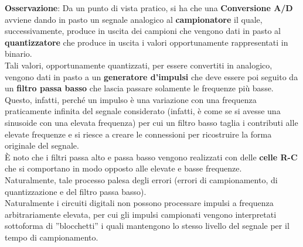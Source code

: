 \documentclass[a4paper]{extarticle}
\newcommand{\quotes}[1]{''#1''}
\begin{document}
\vspace{1em}
\noindent
\textbf{Osservazione}: Da un punto di vista pratico, si ha che una \textbf{Conversione A/D} avviene dando in pasto un segnale analogico al \textbf{campionatore} il quale, successivamente, produce in uscita dei campioni che vengono dati in pasto al \textbf{quantizzatore} che produce in uscita i valori opportunamente rappresentati in binario.\\
Tali valori, opportunamente quantizzati, per essere convertiti in analogico, vengono dati in pasto a un \textbf{generatore d'impulsi} che deve essere poi seguito da un \textbf{filtro passa basso} che lascia passare solamente le frequenze più basse. Questo, infatti, perché un impulso è una variazione con una frequenza praticamente infinita del segnale considerato (infatti, è come se si avesse una sinusoide con una elevata frequenza) per cui un filtro basso taglia i contributi alle elevate frequenze e si riesce a creare le connessioni per ricostruire la forma originale del segnale.\\
È noto che i filtri passa alto e passa basso vengono realizzati con delle \textbf{celle R-C} che si comportano in modo opposto alle elevate e basse frequenze.\\
Naturalmente, tale processo palesa degli errori (errori di campionamento, di quantizzazione e del filtro passa basso).\\
Naturalmente i circuiti digitali non possono processare impulsi a frequenza arbitrariamente elevata, per cui gli impulsi campionati vengono interpretati sottoforma di \quotes{blocchetti} i quali mantengono lo stesso livello del segnale per il tempo di campionamento.

\vspace{1em}
\end{document}
